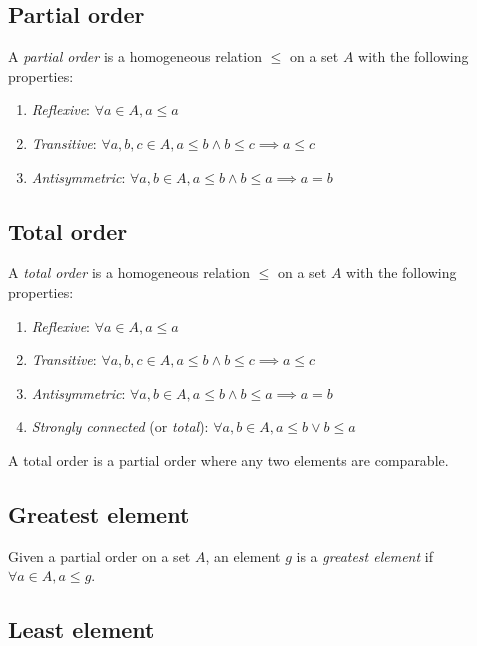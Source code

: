 \documentclass{article}
\begin{document}
\subsection{Partial order}

A \textit{partial order} is a homogeneous relation \(\leq\) on a set \(A\)
with the following properties:
\begin{enumerate}
    \item \textit{Reflexive}: \(\forall a \in A, a \leq a\)
    \item \textit{Transitive}: \(\forall a,b,c \in A, a \leq b \land b \leq c \implies a \leq c\)
    \item \textit{Antisymmetric}: \(\forall a,b \in A, a \leq b \land b \leq a \implies a=b\)
\end{enumerate}

\subsection{Total order}

A \textit{total order} is a homogeneous relation \(\leq\) on a set \(A\)
with the following properties:

\begin{enumerate}
    \item \textit{Reflexive}: \(\forall a \in A, a \leq a\)
    \item \textit{Transitive}: \(\forall a,b,c \in A, a \leq b \land b \leq c \implies a \leq c\)
    \item \textit{Antisymmetric}: \(\forall a,b \in A, a \leq b \land b \leq a \implies a=b\)
    \item \textit{Strongly connected} (or \textit{total}): \(\forall a,b\in A, a \leq b \lor b\leq a\)
\end{enumerate}

A total order is a partial order where any two elements are comparable.

\subsection{Greatest element}

Given a partial order on a set \(A\), an element \(g\) is a \textit{greatest element}
if \(\forall a\in A, a \leq g\).

\subsection{Least element}
\end{document}
